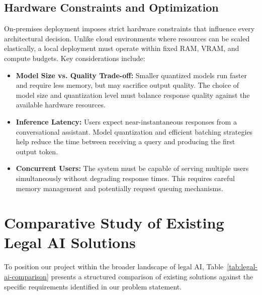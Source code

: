 \subsection{Hardware Constraints and Optimization}

On-premises deployment imposes strict hardware constraints that influence
every architectural decision. Unlike cloud environments where resources
can be scaled elastically, a local deployment must operate within fixed
\ac{RAM}, \ac{VRAM}, and compute budgets. Key considerations include:

\begin{itemize}
    \item \textbf{Model Size vs. Quality Trade-off:} Smaller quantized
    models run faster and require less memory, but may sacrifice output
    quality. The choice of model size and quantization level must balance
    response quality against the available hardware resources.

    \item \textbf{Inference Latency:} Users expect near-instantaneous
    responses from a conversational assistant. Model quantization and
    efficient batching strategies help reduce the time between receiving
    a query and producing the first output token.

    \item \textbf{Concurrent Users:} The system must be capable of serving
    multiple users simultaneously without degrading response times. This
    requires careful memory management and potentially request queuing
    mechanisms.
\end{itemize}

\section{Comparative Study of Existing Legal AI Solutions}
\label{sec:comparative-study}

To position our project within the broader landscape of legal \ac{AI},
Table~\ref{tab:legal-ai-comparison} presents a structured comparison of
existing solutions against the specific requirements identified in our
problem statement.

